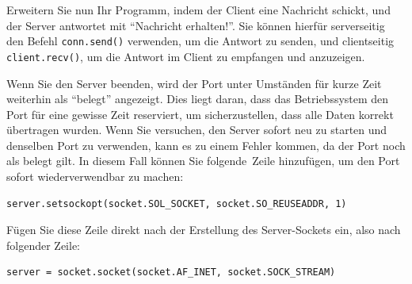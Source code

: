\begin{myexercise}
    Erweitern Sie nun Ihr Programm, indem der Client eine Nachricht schickt, und der Server antwortet mit \enquote{Nachricht erhalten!}. Sie können hierfür serverseitig den Befehl \lstinline|conn.send()| verwenden, um die Antwort zu senden, und clientseitig \lstinline|client.recv()|, um die Antwort im Client zu empfangen und anzuzeigen. 
\end{myexercise}

\begin{myattention}
    Wenn Sie den Server beenden, wird der Port unter Umständen für kurze Zeit weiterhin als \enquote{belegt} angezeigt. Dies liegt daran, dass das Betriebssystem den Port für eine gewisse Zeit reserviert, um sicherzustellen, dass alle Daten korrekt übertragen wurden. Wenn Sie versuchen, den Server sofort neu zu starten und denselben Port zu verwenden, kann es zu einem Fehler kommen, da der Port noch als belegt gilt. In diesem Fall können Sie folgende Zeile hinzufügen, um den Port sofort wiederverwendbar zu machen:
    \begin{lstlisting}
server.setsockopt(socket.SOL_SOCKET, socket.SO_REUSEADDR, 1)
    \end{lstlisting}
    Fügen Sie diese Zeile direkt nach der Erstellung des Server-Sockets ein, also nach folgender Zeile:
    \begin{lstlisting}
server = socket.socket(socket.AF_INET, socket.SOCK_STREAM)
    \end{lstlisting}
\end{myattention}

